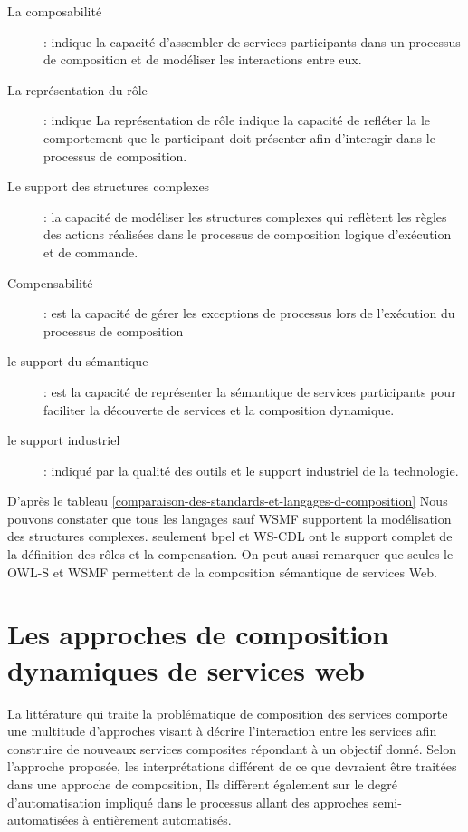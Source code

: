   \renewcommand{\descriptionlabel}[1]{\hspace{0.5cm}\textbullet~\textsf{#1}}
  \begin{description}
  \item [La composabilité]: indique la capacité d'assembler de
    services participants dans un processus de composition et de
    modéliser les interactions entre eux.

  \item [La représentation du rôle]: indique La représentation de rôle
    indique la capacité de refléter la le comportement que le
    participant doit présenter afin d'interagir dans le processus de
    composition.

  \item [Le support des structures complexes]: la capacité de
    modéliser les structures complexes qui reflètent les règles des
    actions réalisées dans le processus de composition logique
    d'exécution et de commande.

  \item [Compensabilité]: est la capacité de gérer les exceptions de
    processus lors de l'exécution du processus de composition

  \item [le support du sémantique]: est la capacité de représenter la
    sémantique de services participants pour faciliter la découverte
    de services et la composition dynamique.

  \item [le support industriel]: indiqué par la qualité des outils et
    le support industriel de la technologie.
  \end{description}
  \enddescription

  D'après le tableau
  \ref{comparaison-des-standards-et-langages-d-composition} Nous
  pouvons constater que tous les langages sauf \textsc{WSMF}
  supportent la modélisation des structures complexes. seulement
  \acrshort{bpel} et \textsc{WS-CDL} ont le support complet de la
  définition des rôles et la compensation. On peut aussi remarquer que
  seules le \textsc{OWL-S} et \textsc{WSMF} permettent de la
  composition sémantique de services Web.

  \section{Les approches de composition dynamiques de services web}
  \label{sec:comp-dynam}
  La littérature qui traite la problématique de composition des
  services comporte une multitude d'approches visant à décrire
  l'interaction entre les services afin construire de nouveaux
  services composites répondant à un objectif donné. Selon l'approche
  proposée, les interprétations différent de ce que devraient être
  traitées dans une approche de composition, Ils diffèrent également
  sur le degré d'automatisation impliqué dans le processus allant des
  approches semi-automatisées à entièrement automatisés.\medskip

